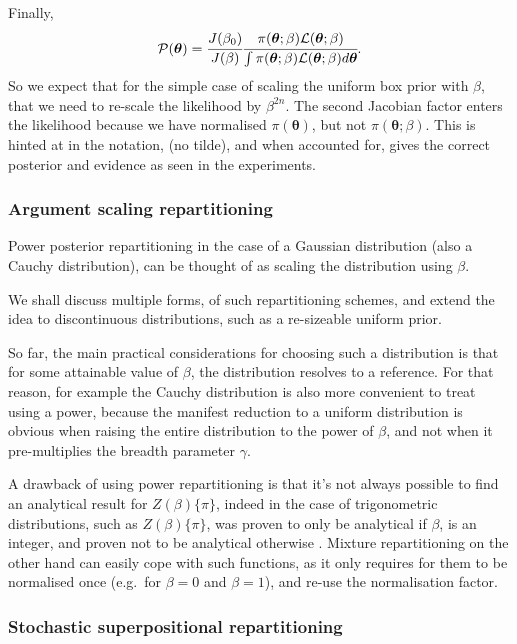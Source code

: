 \documentclass[usenatbib]{mnras}
\begin{document}
Finally, 
\begin{equation*}
 {\cal P}(\bm{\theta}) = \cfrac{J(\beta_{0})}{J(\beta)} \cfrac{\pi(\bm{\theta}; \beta) {\cal L}(\bm{\theta}; \beta)}{\int \pi(\bm{\theta}; \beta) {\cal L}(\bm{\theta}; \beta) d \bm{\theta}}.
\end{equation*}
So we expect that for the simple case of scaling the uniform box
prior with \(\beta\), that we need to re-scale the likelihood by
\(\beta^{2n}\). The second Jacobian factor enters the likelihood because
we have normalised \(\pi(\bm{\theta})\), but not \(\pi(\bm{\theta}; \beta)\). This is hinted at in
the notation, (no tilde), and when accounted for, gives  the correct
posterior and evidence as seen in the experiments. 


\subsubsection{Argument scaling repartitioning}\label{sec:orgfe92f25}

Power posterior repartitioning in the case of a Gaussian
distribution (also a Cauchy distribution), can be thought of as
scaling the distribution using \(\beta\).

We shall discuss multiple forms, of such repartitioning schemes,
and extend the idea to discontinuous distributions, such as a
re-sizeable uniform prior.  

So far, the main practical considerations for choosing such a
distribution is that for some attainable value of \(\beta\), the
distribution resolves to a reference. For that reason, for example
the Cauchy distribution is also more convenient to treat using a
power, because the manifest reduction to a uniform distribution is
obvious when raising the entire distribution to the power of
\(\beta\), and not when it pre-multiplies the breadth parameter
\(\gamma\).

A drawback of using power repartitioning is that it's not always
possible to find an analytical result for \(Z(\beta)\{\pi\}\), indeed
in the case of trigonometric distributions, such as \(Z(\beta)\{\pi\}\),
was proven to only be analytical if \(\beta\), is an integer, and
proven not to be analytical otherwise \citep{Liouville1837}. Mixture
repartitioning on the other hand can easily cope with such
functions, as it only requires for them to be normalised once
(e.g.~for \(\beta=0\) and \(\beta=1\)), and re-use the normalisation
factor.


\subsubsection{Stochastic superpositional repartitioning}
\end{document}
